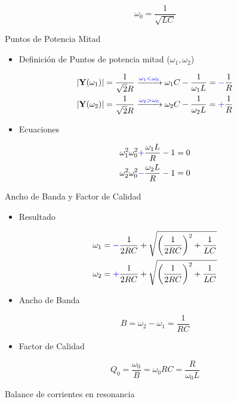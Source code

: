 \[
  \boxed{\omega_0 = \frac{1}{\sqrt{LC}}}
\]

{Puntos de Potencia Mitad}

\begin{itemize}
\item Definición de Puntos de potencia mitad (\(\omega_1, \omega_2\))
\end{itemize}
\begin{align*}
|\mathbf{Y}(\omega_1)| &= \frac{1}{\sqrt{2} R} \xrightarrow{\textcolor{blue}{\omega_1 < \omega_0}} \omega_1 C - \frac{1}{\omega_1 L} = \textcolor{blue}{-}\frac{1}{R}\\
|\mathbf{Y}(\omega_2)| &= \frac{1}{\sqrt{2} R} \xrightarrow{\textcolor{blue}{\omega_2 > \omega_0}} \omega_2 C - \frac{1}{\omega_2 L} =  \textcolor{blue}{+}\frac{1}{R}
\end{align*}

\begin{itemize}
\item Ecuaciones
\end{itemize}
\begin{align*}
  \omega_1^2 \omega_0^2 \textcolor{blue}{+} \frac{\omega_1 L}{R} - 1 &= 0\\
  \omega_2^2 \omega_0^2 \textcolor{blue}{-} \frac{\omega_2 L}{R} - 1 &= 0
\end{align*}

{Ancho de Banda y Factor de Calidad}

\begin{itemize}
\item Resultado
\end{itemize}
\begin{align*}
\omega_1 &= \textcolor{blue}{-}\frac{1}{2RC} + \sqrt{\left(\frac{1}{2RC}\right)^2 + \frac{1}{LC}}\\
\omega_2 &= \textcolor{blue}{+}\frac{1}{2RC} + \sqrt{\left(\frac{1}{2RC}\right)^2 + \frac{1}{LC}}
\end{align*}

\begin{itemize}
\item Ancho de Banda
\end{itemize}
\[
\boxed{B = \omega_2 - \omega_1 = \frac{1}{RC}}
\]

\begin{itemize}
\item Factor de Calidad
\end{itemize}
\[
  \boxed{Q_0 = \frac{\omega_0}{B} = \omega_0 R C = \frac{R}{\omega_0 L}}
\]

{Balance de corrientes en resonancia}

